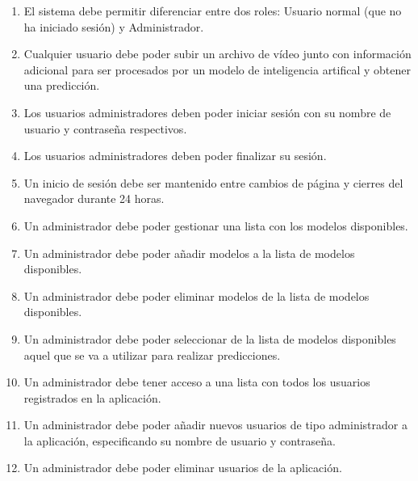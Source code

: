 \begin{enumerate}[start=1,label={\bfseries RF\arabic*:}]
    \item El sistema debe permitir diferenciar entre dos roles: Usuario normal
          (que no ha iniciado sesión) y Administrador.

          
    \item Cualquier usuario debe poder subir un archivo de vídeo junto con
          información adicional para ser procesados por un modelo de
          inteligencia artifical y obtener una predicción.


    \item Los usuarios administradores deben poder iniciar sesión con su nombre
          de usuario y contraseña respectivos.
    \item Los usuarios administradores deben poder finalizar su sesión.
    \item Un inicio de sesión debe ser mantenido entre cambios de página y
          cierres del navegador durante 24 horas.
    \item Un administrador debe poder gestionar una lista con los modelos
          disponibles.


    \item Un administrador debe poder añadir modelos a la lista de modelos
          disponibles.
    \item Un administrador debe poder eliminar modelos de la lista de modelos
          disponibles.
    \item Un administrador debe poder seleccionar de la lista de modelos
          disponibles aquel que se va a utilizar para realizar predicciones.
    \item Un administrador debe tener acceso a una lista con todos los usuarios
          registrados en la aplicación.


    \item Un administrador debe poder añadir nuevos usuarios de tipo
          administrador a la aplicación, especificando su nombre de usuario y
          contraseña.
    \item Un administrador debe poder eliminar usuarios de la aplicación.
\end{enumerate}

